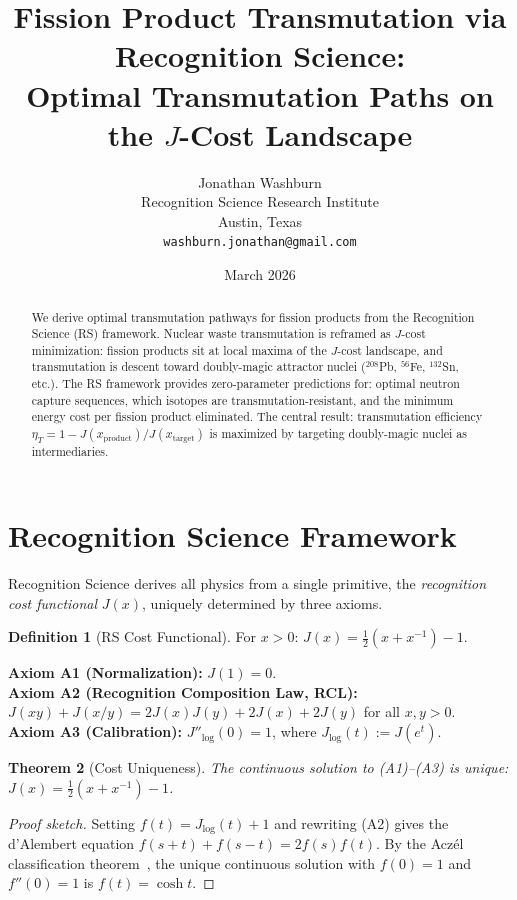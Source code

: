 \documentclass[12pt,a4paper]{article}
\title{Fission Product Transmutation via Recognition Science:\\
Optimal Transmutation Paths on the $J$-Cost Landscape}
\author{Jonathan Washburn\\
Recognition Science Research Institute\\
Austin, Texas\\
\texttt{washburn.jonathan@gmail.com}}
\date{March 2026}
\newtheorem{theorem}{Theorem}[section]
\theoremstyle{definition}
\newtheorem{definition}[theorem]{Definition}
\theoremstyle{remark}
\begin{document}
\maketitle

\begin{abstract}
We derive optimal transmutation pathways for fission products from the Recognition Science (RS) 
framework. Nuclear waste transmutation is reframed as $J$-cost minimization: fission products 
sit at local maxima of the $J$-cost landscape, and transmutation is descent toward doubly-magic 
attractor nuclei (${}^{208}$Pb, ${}^{56}$Fe, ${}^{132}$Sn, etc.). The RS framework provides 
zero-parameter predictions for: optimal neutron capture sequences, which isotopes are 
transmutation-resistant, and the minimum energy cost per fission product eliminated. 
The central result: transmutation efficiency $\eta_T = 1 - J(x_\mathrm{product})/J(x_\mathrm{target})$ 
is maximized by targeting doubly-magic nuclei as intermediaries.
\end{abstract}

\section{Recognition Science Framework}
\label{sec:framework}

Recognition Science derives all physics from a single primitive,
the \emph{recognition cost functional} $J(x)$, uniquely determined
by three axioms.

\begin{definition}[RS Cost Functional]
For $x > 0$: $J(x) = \tfrac{1}{2}(x + x^{-1}) - 1$.
\end{definition}

\noindent\textbf{Axiom A1 (Normalization):} $J(1) = 0$.\\
\textbf{Axiom A2 (Recognition Composition Law, RCL):}
$J(xy) + J(x/y) = 2J(x)J(y) + 2J(x) + 2J(y)$ for all $x, y > 0$.\\
\textbf{Axiom A3 (Calibration):} $J''_{\log}(0) = 1$, where
$J_{\log}(t) := J(e^t)$.

\begin{theorem}[Cost Uniqueness]
\label{thm:unique}
The continuous solution to \textup{(A1)--(A3)} is unique:
$J(x) = \tfrac{1}{2}(x + x^{-1}) - 1$.
\end{theorem}

\begin{proof}[Proof sketch]
Setting $f(t) = J_{\log}(t) + 1$ and rewriting \textup{(A2)} gives the
d'Alembert equation $f(s+t) + f(s-t) = 2f(s)f(t)$.  By the Acz\'el
classification theorem~\cite{Aczel1966}, the unique continuous solution
with $f(0) = 1$ and $f''(0) = 1$ is $f(t) = \cosh t$.
\end{proof}
\end{document}
